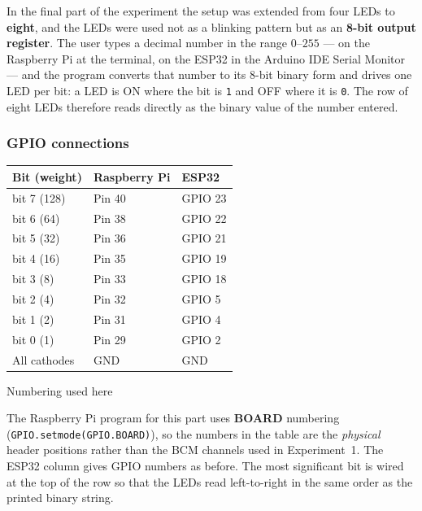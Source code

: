 \documentclass[10pt,a4paper]{article}
\begin{document}
In the final part of the experiment the setup was extended from four LEDs to
\textbf{eight}, and the LEDs were used not as a blinking pattern but as an
\textbf{8-bit output register}. The user types a decimal number in the range
$0$--$255$ --- on the Raspberry Pi at the terminal, on the ESP32 in the Arduino IDE
Serial Monitor --- and the program converts that number to its 8-bit binary form and
drives one LED per bit: a LED is ON where the bit is \texttt{1} and OFF where it is
\texttt{0}. The row of eight LEDs therefore reads directly as the binary value of the
number entered.

\subsubsection{GPIO connections}

\vspace{2pt}
\noindent
\begin{minipage}[t]{0.48\textwidth}
\vspace{0pt}
\begin{tabularx}{\linewidth}{@{}l l X@{}}
\toprule
\rowcolor{soft}
\textbf{Bit (weight)} & \textbf{Raspberry Pi} & \textbf{ESP32} \\
\midrule
bit 7 (128) & Pin 40 & GPIO 23 \\
bit 6 (64)  & Pin 38 & GPIO 22 \\
bit 5 (32)  & Pin 36 & GPIO 21 \\
bit 4 (16)  & Pin 35 & GPIO 19 \\
bit 3 (8)   & Pin 33 & GPIO 18 \\
bit 2 (4)   & Pin 32 & GPIO 5  \\
bit 1 (2)   & Pin 31 & GPIO 4  \\
bit 0 (1)   & Pin 29 & GPIO 2  \\
\midrule
All cathodes & GND & GND \\
\bottomrule
\end{tabularx}
\end{minipage}\hfill
\begin{minipage}[t]{0.49\textwidth}
\vspace{0pt}
\begin{titledbox}{Numbering used here}
\raggedright
The Raspberry Pi program for this part uses \textbf{BOARD} numbering
(\texttt{GPIO.setmode(GPIO.BOARD)}), so the numbers in the table are the
\emph{physical} header positions rather than the BCM channels used in
Experiment~1. The ESP32 column gives GPIO numbers as before. The most significant
bit is wired at the top of the row so that the LEDs read left-to-right in the same
order as the printed binary string.
\end{titledbox}
\end{minipage}
\end{document}
